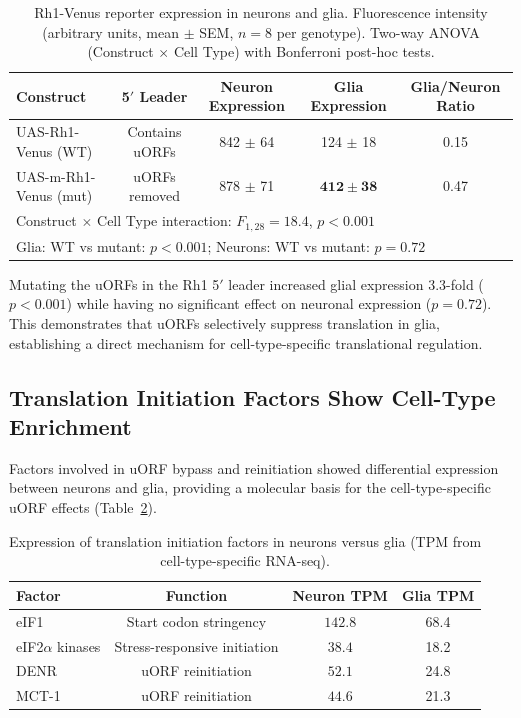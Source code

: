 \documentclass[11pt]{article}
\begin{document}
\begin{table}[H]
\centering
\caption{Rh1-Venus reporter expression in neurons and glia. Fluorescence intensity (arbitrary units, mean $\pm$ SEM, $n = 8$ per genotype). Two-way ANOVA (Construct $\times$ Cell Type) with Bonferroni post-hoc tests.}
\label{tab:reporter}
\begin{tabular}{lcccc}
\toprule
Construct & 5$'$ Leader & Neuron Expression & Glia Expression & Glia/Neuron Ratio \\
\midrule
UAS-Rh1-Venus (WT) & Contains uORFs & 842 $\pm$ 64 & 124 $\pm$ 18 & 0.15 \\
UAS-m-Rh1-Venus (mut) & uORFs removed & 878 $\pm$ 71 & $\mathbf{412 \pm 38}$ & 0.47 \\
\midrule
\multicolumn{5}{l}{Construct $\times$ Cell Type interaction: $F_{1,28} = 18.4$, $p < 0.001$} \\
\multicolumn{5}{l}{Glia: WT vs mutant: $p < 0.001$; Neurons: WT vs mutant: $p = 0.72$} \\
\bottomrule
\end{tabular}
\end{table}

Mutating the uORFs in the Rh1 5$'$ leader increased glial expression 3.3-fold ($p < 0.001$) while having no significant effect on neuronal expression ($p = 0.72$). This demonstrates that uORFs selectively suppress translation in glia, establishing a direct mechanism for cell-type-specific translational regulation.

\subsection{Translation Initiation Factors Show Cell-Type Enrichment}

Factors involved in uORF bypass and reinitiation showed differential expression between neurons and glia, providing a molecular basis for the cell-type-specific uORF effects (Table~\ref{tab:factors}).

\begin{table}[H]
\centering
\caption{Expression of translation initiation factors in neurons versus glia (TPM from cell-type-specific RNA-seq).}
\label{tab:factors}
\begin{tabular}{lccc}
\toprule
Factor & Function & Neuron TPM & Glia TPM \\
\midrule
eIF1 & Start codon stringency & $\mathbf{142.8}$ & 68.4 \\
eIF2$\alpha$ kinases & Stress-responsive initiation & $\mathbf{38.4}$ & 18.2 \\
DENR & uORF reinitiation & $\mathbf{52.1}$ & 24.8 \\
MCT-1 & uORF reinitiation & $\mathbf{44.6}$ & 21.3 \\
\bottomrule
\end{tabular}
\end{table}
\end{document}

